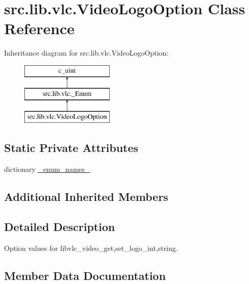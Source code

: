 \hypertarget{classsrc_1_1lib_1_1vlc_1_1VideoLogoOption}{}\section{src.\+lib.\+vlc.\+Video\+Logo\+Option Class Reference}
\label{classsrc_1_1lib_1_1vlc_1_1VideoLogoOption}
Inheritance diagram for src.\+lib.\+vlc.\+Video\+Logo\+Option\+:\begin{figure}[H]
\begin{center}
\leavevmode
\includegraphics[height=3.000000cm]{classsrc_1_1lib_1_1vlc_1_1VideoLogoOption}
\end{center}
\end{figure}
\subsection*{Static Private Attributes}
\begin{DoxyCompactItemize}
\item 
dictionary \hyperlink{classsrc_1_1lib_1_1vlc_1_1VideoLogoOption_ac64c121a5e6196560c51e4ae1e6b0c77}{\+\_\+enum\+\_\+names\+\_\+}
\end{DoxyCompactItemize}
\subsection*{Additional Inherited Members}


\subsection{Detailed Description}
\begin{DoxyVerb}Option values for libvlc_video_{get,set}_logo_{int,string}.
\end{DoxyVerb}
 

\subsection{Member Data Documentation}
\hypertarget{classsrc_1_1lib_1_1vlc_1_1VideoLogoOption_ac64c121a5e6196560c51e4ae1e6b0c77}{}
